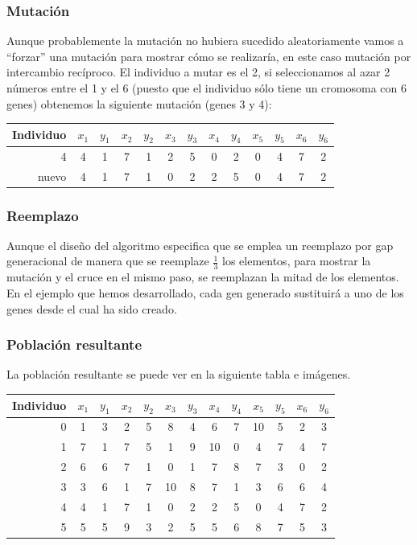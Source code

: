 \documentclass[a4paper]{article}
\begin{document}
\subsubsection{Mutación}
Aunque probablemente la mutación no hubiera sucedido aleatoriamente vamos a ``forzar'' una mutación para mostrar cómo se realizaría, en este caso mutación por intercambio recíproco. El individuo a mutar es el 2, si seleccionamos al azar 2 números entre el 1 y el 6 (puesto que el individuo sólo tiene un cromosoma con 6 genes) obtenemos la siguiente mutación (genes 3 y 4):

\begin{center}
\begin{tabular}{r|c c|c c|c c|c c|c c|c c}
Individuo & $x_1$ & $y_1$ & $x_2$ & $y_2$ & $x_3$ & $y_3$ & $x_4$ & $y_4$ & $x_5$ & $y_5$ & $x_6$ & $y_6$ \\ \hline
4     & 4 & 1 & 7 & 1 & 2  & 5 & 0  & 2 & 0  & 4 & 7 & 2 \\
nuevo & 4 & 1 & 7 & 1 & 0  & 2 & 2  & 5 & 0  & 4 & 7 & 2 \\
\end{tabular}
\end{center}


\subsubsection{Reemplazo}
Aunque el diseño del algoritmo especifica que se emplea un reemplazo por gap generacional de manera que se reemplaze $\frac{1}{3}$ los elementos, para mostrar la mutación y el cruce en el mismo paso, se reemplazan la mitad de los elementos. En el ejemplo que hemos desarrollado, cada gen generado sustituirá a uno de los genes desde el cual ha sido creado.

\subsubsection{Población resultante}
La población resultante se puede ver en la siguiente tabla e imágenes.

\begin{center}
\begin{tabular}{r|c c|c c|c c|c c|c c|c c}
Individuo & $x_1$ & $y_1$ & $x_2$ & $y_2$ & $x_3$ & $y_3$ & $x_4$ & $y_4$ & $x_5$ & $y_5$ & $x_6$ & $y_6$ \\ \hline
0 & 1 & 3 & 2 & 5 & 8  & 4 & 6  & 7 & 10 & 5 & 2 & 3 \\
1 & 7 & 1 & 7 & 5 & 1  & 9 & 10 & 0 & 4  & 7 & 4 & 7 \\
2 & 6 & 6 & 7 & 1 & 0  & 1 & 7  & 8 & 7  & 3 & 0 & 2 \\
3 & 3 & 6 & 1 & 7 & 10 & 8 & 7  & 1 & 3  & 6 & 6 & 4 \\
4 & 4 & 1 & 7 & 1 & 0  & 2 & 2  & 5 & 0  & 4 & 7 & 2 \\
5 & 5 & 5 & 9 & 3 & 2  & 5 & 5  & 6 & 8  & 7 & 5 & 3 \\
\end{tabular}
\end{center}
\end{document}
